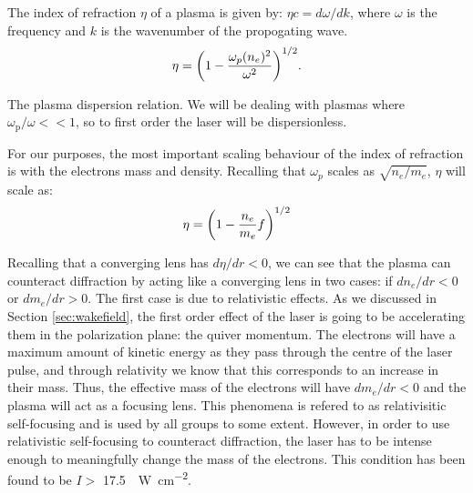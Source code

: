 \documentclass[12pt,letter]{article}
\renewcommand{\footnotesize}{\scriptsize}
\begin{document}
   The index of refraction $\eta$ of a plasma is given by: $\eta c = d \omega / d k$,
   where $\omega$ is the frequency and $k$ is the wavenumber of the propogating
   wave. 
   \begin{equation}
    \label{eq:index}
    \eta = \qty(1-\frac{\omega_p(n_e)^2}{\omega^2})^{1/2}.
\end{equation}
\begin{marginfigure}
    \caption{\label{fig:dispersion}The plasma dispersion relation. We will be
        dealing with plasmas where $\omega_\mathrm{p}/\omega << 1$, so to
    first order the laser will be dispersionless. }
    \end{marginfigure}

For our purposes, the most important scaling behaviour of the
index of refraction is with the electrons mass and density. Recalling that
$\omega_p$ scales as $\sqrt{n_e/m_e}$, $\eta$ will scale as:
\begin{equation}
    \label{eq:etascale}
    \eta = \qty(1-\frac{n_e}{m_e}f)^{1/2}
\end{equation}

Recalling that a converging lens has $d\eta/dr < 0$, we can see that the plasma
can counteract diffraction by acting like a converging lens in two cases: if $d
n_e/dr <0$ or $d m_e/dr >0$.
The first case is due to relativistic effects. As we discussed in Section
\ref{sec:wakefield}, the first order effect of the laser is going to be
accelerating them in the polarization plane: the quiver momentum. The electrons
will have a maximum amount of kinetic energy as they pass through the centre of
the laser pulse, and through relativity we know that this corresponds to an
increase in their mass. Thus, the effective mass of the electrons will have
$dm_e/dr<0$ and the plasma will act as a focusing lens. This phenomena is
refered to as relativisitic self-focusing and is used by all groups to some
extent. However, in order to use relativistic self-focusing to counteract diffraction,
the laser has to be intense enough to meaningfully change the mass of the
electrons. This condition has been found to be $I >$ \SI{17.5}{\giga
\watt\per\centi\meter^2}\cite{}.
\end{document}
